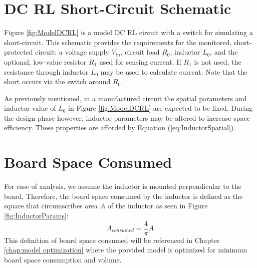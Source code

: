 \documentclass[11pt,compsoc,oneside]{report}
\begin{document}
\section{DC RL Short-Circuit Schematic}
Figure \ref{fig:ModelDCRL} is a model DC RL circuit with a switch for simulating a short-circuit. This schematic provides the requirements for the monitored, short-protected circuit: a voltage supply $V_{in}$, circuit load $R_{0}$, inductor $L_{0}$, and the optional, low-value resistor $R_{1}$ used for sensing current. If $R_{1}$ is not used, the resistance through inductor $L_{0}$ may be used to calculate current. Note that the short occurs via the switch around $R_{0}$.

As previously mentioned, in a manufactured circuit the spatial parameters and inductor value of $L_0$ in Figure \ref{fig:ModelDCRL} are expected to be fixed. During the design phase however, inductor parameters may be altered to increase space efficiency. These properties are afforded by Equation (\ref{eq:InductorSpatial}).

\section{Board Space Consumed}
For ease of analysis, we assume the inductor is mounted perpendicular to the board. Therefore, the board space consumed by the inductor is defined as the square that circumscribes area $A$ of the inductor as seen in Figure \ref{fig:InductorParams}:
\begin{equation}\label{eq:AreaConsumed}
A_{consumed} = \frac{4}{\pi}A
\end{equation}
This definition of board space consumed will be referenced in Chapter \ref{chap:model optimization} where the provided model is optimized for minimum board space consumption and volume.
\end{document}
